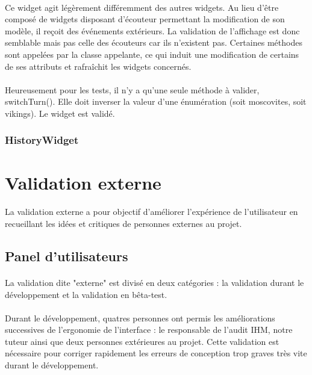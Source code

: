\documentclass[11pt]{article} %
\begin{document}
\paragraph{}
Ce widget agit légèrement différemment des autres widgets. Au lieu d'être composé de widgets disposant d’écouteur permettant la modification de son modèle, il reçoit des événements extérieurs. La validation de l'affichage est donc semblable mais pas celle des écouteurs car ils n'existent pas. Certaines méthodes sont appelées par la classe appelante, ce qui induit une modification de certains de ses attributs et rafraîchit les widgets concernés.
\paragraph{}
Heureusement pour les tests, il n'y a qu'une seule méthode à valider, switchTurn(). Elle doit inverser la valeur d'une énumération (soit moscovites, soit vikings). Le widget est validé.

\subsubsection{HistoryWidget}

\paragraph{}

\section{Validation externe}
\paragraph{}
La validation externe a pour objectif d'améliorer l’expérience de l'utilisateur en recueillant les idées et critiques de personnes externes au projet.

\subsection{Panel d'utilisateurs}
\paragraph{}
La validation dite "externe" est divisé en deux catégories : la validation durant le développement et la validation en bêta-test. 
\paragraph{}
Durant le développement, quatres personnes ont permis les améliorations successives de l'ergonomie de l'interface : le responsable de l'audit IHM, notre tuteur ainsi que deux personnes extérieures au projet. Cette validation est nécessaire pour corriger rapidement les erreurs de conception trop graves très vite durant le développement.
\end{document}
